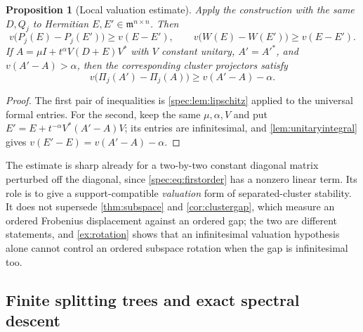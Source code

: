 \documentclass[11pt,a4paper]{article}
\numberwithin{equation}{section}
\newtheorem{proposition}[proposition]{Proposition}
\theoremstyle{definition}
\theoremstyle{remark}
\newcommand{\mm}{\mathfrak m}
\begin{document}
\begin{proposition}[Local valuation estimate]\label{spec:prop:localstability}
Apply the construction with the same $D,Q_j$ to Hermitian
$E,E'\in\mm^{n\times n}$. Then
\[
 v\bigl(P_j(E)-P_j(E')\bigr)\ge v(E-E'),\qquad
 v\bigl(W(E)-W(E')\bigr)\ge v(E-E').
\]
If $A=\mu I+t^\alpha V(D+E)V^*$ with $V$ constant unitary, $A'=A'^*$, and
$v(A'-A)>\alpha$, then the corresponding cluster projectors satisfy
\begin{equation}\label{spec:eq:gapbound}
 v\bigl(\Pi_j(A')-\Pi_j(A)\bigr)\ge v(A'-A)-\alpha.
\end{equation}
\end{proposition}
\begin{proof}
The first pair of inequalities is \cref{spec:lem:lipschitz} applied to the
universal formal entries. For the second, keep the same $\mu,\alpha,V$ and
put $E'=E+t^{-\alpha}V^*(A'-A)V$; its entries are infinitesimal, and
\cref{lem:unitaryintegral} gives $v(E'-E)=v(A'-A)-\alpha$.
\end{proof}

The estimate is sharp already for a two-by-two constant diagonal matrix
perturbed off the diagonal, since \eqref{spec:eq:firstorder} has a nonzero
linear term. Its role is to give a support-compatible \emph{valuation} form
of separated-cluster stability. It does not supersede \cref{thm:subspace}
and \cref{cor:clustergap}, which measure an ordered Frobenius displacement
against an ordered gap; the two are different statements, and
\cref{ex:rotation} shows that an infinitesimal valuation hypothesis alone
cannot control an ordered subspace rotation when the gap is infinitesimal
too.

\subsection{Finite splitting trees and exact spectral descent}
\end{document}
